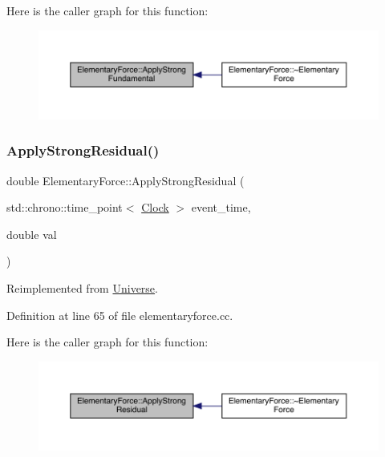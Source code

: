 Here is the caller graph for this function\+:
\nopagebreak
\begin{figure}[H]
\begin{center}
\leavevmode
\includegraphics[width=350pt]{class_elementary_force_a80f1977e777aa0c8cce2124b666e6446_icgraph}
\end{center}
\end{figure}
\mbox{\label{class_elementary_force_a185dc4e0b840505df27dbbed9fdcdc7b}} 
\subsubsection{\texorpdfstring{Apply\+Strong\+Residual()}{ApplyStrongResidual()}}
{\footnotesize\ttfamily double Elementary\+Force\+::\+Apply\+Strong\+Residual (\begin{DoxyParamCaption}\item[{std\+::chrono\+::time\+\_\+point$<$ \hyperlink{universe_8h_a0ef8d951d1ca5ab3cfaf7ab4c7a6fd80}{Clock} $>$}]{event\+\_\+time,  }\item[{double}]{val }\end{DoxyParamCaption})\hspace{0.3cm}{\ttfamily [virtual]}}



Reimplemented from \hyperlink{class_universe_af7becebb347be9a85541d96a3eca1ca7}{Universe}.



Definition at line 65 of file elementaryforce.\+cc.

Here is the caller graph for this function\+:
\nopagebreak
\begin{figure}[H]
\begin{center}
\leavevmode
\includegraphics[width=350pt]{class_elementary_force_a185dc4e0b840505df27dbbed9fdcdc7b_icgraph}
\end{center}
\end{figure}
\mbox{\label{class_elementary_force_aabf66a859e6e808a65c6929cd16f7597}} 
